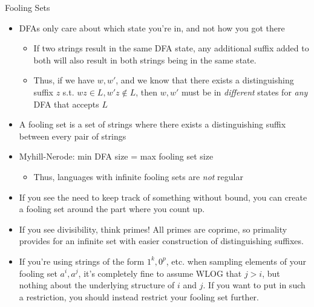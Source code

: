 \documentclass{beamer}
\begin{document}
\begin{frame}[t]{Fooling Sets}
    \begin{itemize}
        \item DFAs only care about which state you're in, and not how you got there
        \begin{itemize}
            \item If two strings result in the same DFA state, any additional suffix added to both will also result in both strings being in the same state.
            \item \pause Thus, if we have $w, w'$, and we know that there exists a \alert{distinguishing suffix} $z$ s.t. $wz \in L, w'z \not\in L$, then $w, w'$ must be in \textit{different} states for \textit{any} DFA that accepts $L$ 
        \end{itemize}
        \item\pause A \alert{fooling set} is a set of strings where there exists a distinguishing suffix between every pair of strings
        \item Myhill-Nerode: min DFA size = max fooling set size
        \begin{itemize}
            \item \pause Thus, languages with infinite fooling sets are \textit{not} regular
        \end{itemize}
        \item \pause If you see the need to keep track of something without bound, you can create a fooling set around the part where you count up.
        \item \pause \alert{If you see divisibility, think primes!} All primes are coprime, so primality provides for an infinite set with easier construction of distinguishing suffixes.
        \item \pause If you're using strings of the form $1^k, 0^p$, etc. when sampling elements of your fooling set $a^i, a^j$, it's completely fine to assume WLOG that $j > i$, but nothing about the underlying structure of $i$ and $j$. If you want to put in such a restriction, you should instead restrict your fooling set further.
    \end{itemize}
\end{frame}
\end{document}
